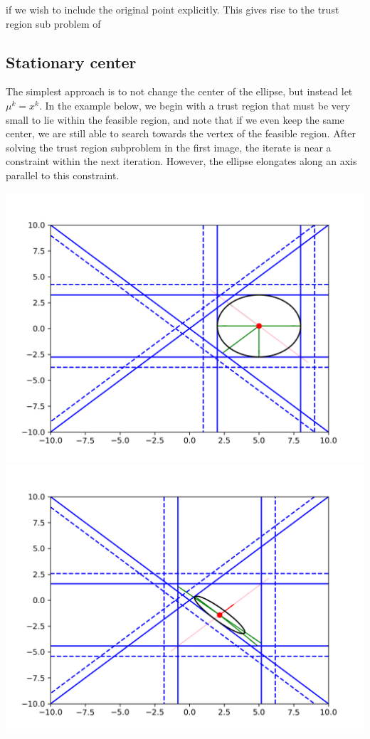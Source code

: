 \documentclass{article}
\begin{document}
if we wish to include the original point explicitly.
This gives rise to the trust region sub problem of











\subsection{Stationary center}
The simplest approach is to not change the center of the ellipse, but instead let $\mu^k = x^k$.
In the example below, we begin with a trust region that must be very small to lie within the feasible region, and note that if we even keep the same center, we are still able to search towards the vertex of the feasible region.
After solving the trust region subproblem in the first image, the iterate is near a constraint within the next iteration.
However, the ellipse elongates along an axis parallel to this constraint.

\includegraphics[scale=0.4]{advantage_of_ellipse_1.png}
\includegraphics[scale=0.4]{advantage_of_ellipse_2.png}
\end{document}
